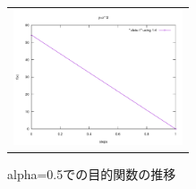 \begin{figure}[h]
\begin{center}
\begin{tabular}{c}
    \begin{minipage}{0.33\hsize}
    \begin{center}
    \includegraphics[width=5.0cm]{figs/level2.1/alpha05.pdf}
    \caption{alpha=0.5での目的関数の推移}
    \label{fig:alpha0.5}
    \end{center}
    \end{minipage}
  \end{tabular}
 \end{center}
\end{figure}

